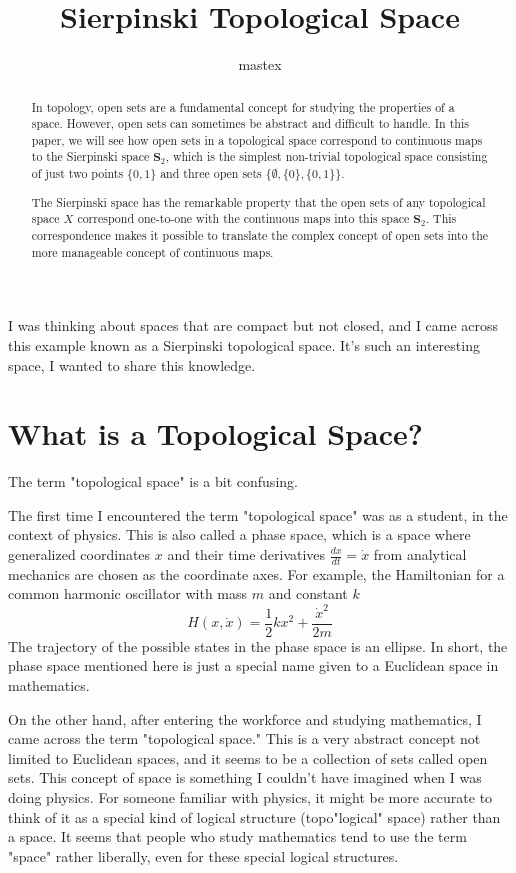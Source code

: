 \documentclass{article}
\title{
Sierpinski Topological Space
}
\author{
mastex
}
\begin{document}
\maketitle

I was thinking about spaces that are compact but not closed, and I came across this example known as a Sierpinski topological space. It's such an interesting space, I wanted to share this knowledge.

\begin{abstract}
	In topology, open sets are a fundamental concept for studying the properties of a space. However, open sets can sometimes be abstract and difficult to handle. In this paper, we will see how open sets in a topological space correspond to continuous maps to the Sierpinski space $\mathbf{S}_ {2}$, which is the simplest non-trivial topological space consisting of just two points $\{0, 1\}$ and three open sets $\{\emptyset, \{0\}, \{0, 1\}\}$.

	The Sierpinski space has the remarkable property that the open sets of any topological space $X$ correspond one-to-one with the continuous maps into this space $\mathbf{S}_ {2}$. This correspondence makes it possible to translate the complex concept of open sets into the more manageable concept of continuous maps.
\end{abstract}

\section{What is a Topological Space?}

The term "topological space" is a bit confusing.

The first time I encountered the term "topological space" was as a student, in the context of physics.
This is also called a phase space,
which is a space where generalized coordinates $x$ and their time derivatives $\frac{dx}{dt} = \dot{x}$ from analytical mechanics are chosen as the coordinate axes.
For example, the Hamiltonian for a common harmonic oscillator with mass $m$ and constant $k$
$$
	H(x,\dot{x}) = \frac{1}{2}kx^{2} + \frac{\dot{x}^{2}}{2m}
$$
The trajectory of the possible states in the phase space is an ellipse.
In short, the phase space mentioned here is just a special name given to a Euclidean space in mathematics.

On the other hand, after entering the workforce and studying mathematics, I came across the term "topological space."
This is a very abstract concept not limited to Euclidean spaces, and it seems to be a collection of sets called open sets.
This concept of space is something I couldn't have imagined when I was doing physics. For someone familiar with physics, it might be more accurate to think of it as a special kind of logical structure (topo"logical" space) rather than a space.
It seems that people who study mathematics tend to use the term "space" rather liberally, even for these special logical structures.
\end{document}
